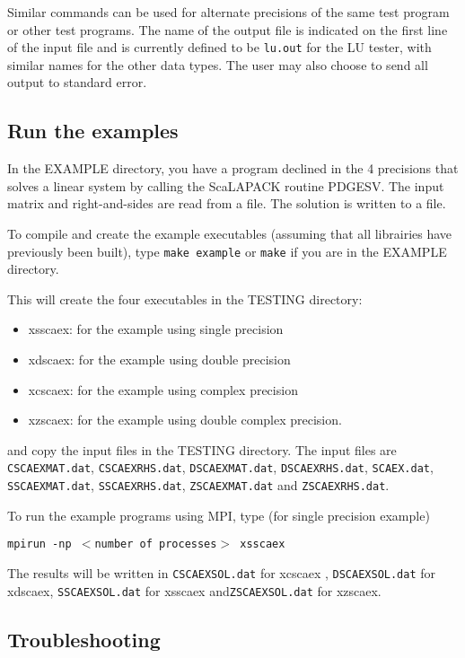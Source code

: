 \documentclass[11pt]{report}
\newcommand{\dent}{\hspace*{\parindent}}
\begin{document}
Similar commands can be used for alternate precisions of the same test
program or other test programs.
The name of the output file is indicated on the first line of the
input file and is currently defined to be {\tt lu.out} for
the LU tester, with similar names for the other data types.  The
user may also choose to send all output to standard error.
 

\subsection{Run the examples}
\label{SLEXAMPLE}
\dent
In the EXAMPLE directory, you have a program declined in the 4 precisions 
that solves a linear system by calling the ScaLAPACK 
routine PDGESV. The input matrix and right-and-sides are
read from a file. The solution is written to a file.

To compile and create the example executables (assuming that all librairies
have previously been built), type {\tt make example} or {\tt make} 
if you are in the EXAMPLE directory.

This will create the four executables in the TESTING directory: 
\begin{itemize}
\item xsscaex: for the example using single precision
\item xdscaex: for the example using double precision
\item xcscaex: for the example using complex precision
\item xzscaex: for the example using double complex precision.
\end{itemize}
and copy the input files in the TESTING directory.
The input files are {\tt CSCAEXMAT.dat}, {\tt CSCAEXRHS.dat},
{\tt DSCAEXMAT.dat}, {\tt DSCAEXRHS.dat}, {\tt SCAEX.dat},
{\tt SSCAEXMAT.dat}, {\tt SSCAEXRHS.dat}, {\tt ZSCAEXMAT.dat} and
{\tt ZSCAEXRHS.dat}.

To run the example programs using MPI, type (for single precision example)
\begin{list}{}{}
\item{\tt mpirun -np $<$number of processes$>$ xsscaex}
\end{list}

The results will be written in {\tt CSCAEXSOL.dat} for xcscaex , 
{\tt DSCAEXSOL.dat} for xdscaex, {\tt SSCAEXSOL.dat} for xsscaex
and{\tt ZSCAEXSOL.dat} for xzscaex.

\subsection{Troubleshooting}
\end{document}
